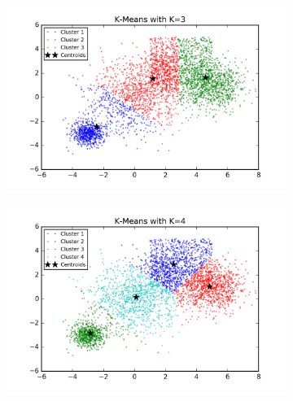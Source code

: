 \begin{description}
\begin{description}
\begin{figure}[!h]
        \centering
        \begin{subfigure}[b]{0.475\textwidth}
            \centering
            \includegraphics[width=\textwidth]{./figures/bigClustering_kMeans_3.png}
        \end{subfigure}
        \hfill
        \begin{subfigure}[b]{0.475\textwidth}  
            \centering 
            \includegraphics[width=\textwidth]{./figures/bigClustering_kMeans_4.png}
        \end{subfigure}
        \begin{subfigure}[b]{0.475\textwidth}  
            \centering 

\end{subfigure}
\end{figure}
\end{description}
\end{description}
